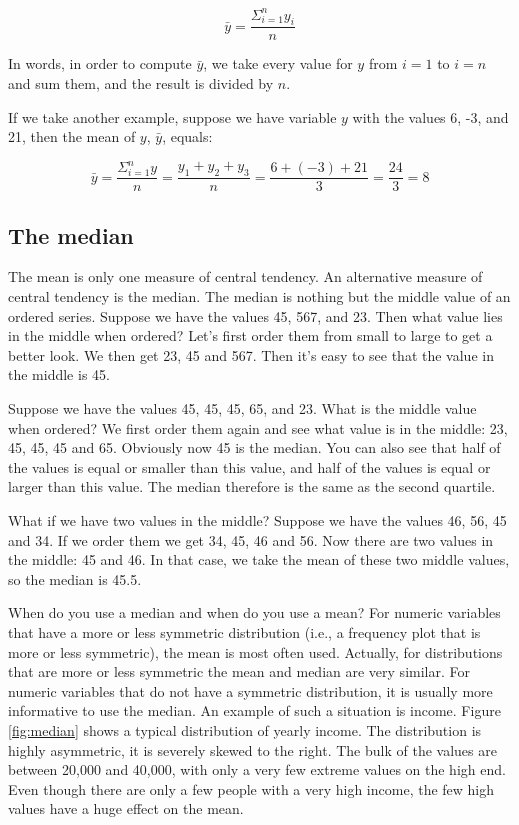 \documentclass[]{book}\usepackage[]{graphicx}\usepackage[]{color}
\begin{document}
\begin{equation}
\bar{y} = \frac{\Sigma_{i=1}^n y_i}{n}
\end{equation}

In words, in order to compute $\bar{y}$, we take every value for $y$ from $i=1$ to $i=n$ and sum them, and the result is divided by $n$.

If we take another example, suppose we have variable $y$ with the values {6, -3, and 21}, then the mean of $y$, $\bar{y}$, equals:

\begin{equation}
\bar{y} = \frac {  \Sigma_{i=1}^n y} {n} =    \frac{y_1 + y_2 + y_3}{n} = \frac{6 + (-3) + 21}{3} = \frac{24}{3} = 8
\end{equation}







\subsection{The median}
The mean is only one measure of central tendency. An alternative measure of central tendency is the median. The median is nothing but the middle value of an ordered series. Suppose we have the values 45, 567, and 23. Then what value lies in the middle when ordered? Let's first order them from small to large to get a better look. We then get 23, 45 and 567. Then it's easy to see that the value in the middle is 45.

Suppose we have the values 45, 45, 45, 65, and 23. What is the middle value when ordered? We first order them again and see what value is in the middle: 23, 45, 45, 45 and 65. Obviously now 45 is the median. You can also see that half of the values is equal or smaller than this value, and half of the values is equal or larger than this value. The median therefore is the same as the second quartile.

What if we have two values in the middle? Suppose we have the values 46, 56, 45 and 34. If we order them we get 34, 45, 46 and 56. Now there are two values in the middle: 45 and 46. In that case, we take the mean of these two middle values, so the median is 45.5. 

When do you use a median and when do you use a mean? For numeric variables that have a more or less symmetric distribution (i.e., a frequency plot that is more or less symmetric), the mean is most often used. Actually, for distributions that are more or less symmetric the mean and median are very similar. For numeric variables that do not have a symmetric distribution, it is usually more informative to use the median. An example of such a situation is income. Figure \ref{fig:median} shows a typical distribution of yearly income. The distribution is highly asymmetric, it is severely skewed to the right. The bulk of the values are between 20,000 and 40,000, with only a very few extreme values on the high end. Even though there are only a few people with a very high income, the few high values have a huge effect on the mean.
\end{document}
